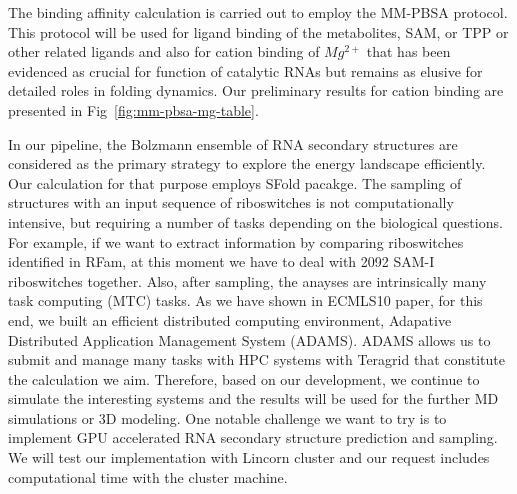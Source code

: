 \documentclass[a4paper,10pt]{article}
\begin{document}
The binding affinity calculation is carried out to employ the MM-PBSA protocol.  This protocol will be used for ligand binding of the metabolites, SAM, or TPP or other related ligands and also for cation binding of ${Mg^{2+}}$ that has been evidenced as crucial for function of catalytic RNAs but remains as elusive for detailed roles in folding dynamics.  Our preliminary results for cation binding are presented in Fig~\ref{fig:mm-pbsa-mg-table}.  


In our pipeline, the Bolzmann ensemble of RNA secondary structures are considered as the primary strategy to explore the energy landscape efficiently.  Our calculation for that purpose employs SFold pacakge\cite{ding2006}. The sampling of structures with an input sequence of riboswitches is not computationally intensive, but requiring a number of tasks depending on the biological questions.  For example, if we want to extract information by comparing riboswitches identified in RFam, at this moment we have to deal with 2092 SAM-I riboswitches together.  Also, after sampling, the anayses are intrinsically many task computing (MTC) tasks.   As we have shown in ECMLS10 paper\cite{ecmls10}, for this end, we built an efficient distributed computing environment, Adapative Distributed Application Management System (ADAMS).  ADAMS allows us to submit and manage many tasks with HPC systems with Teragrid that constitute the calculation we aim.  Therefore, based on our development, we continue to simulate the interesting systems and the results will be used for the further MD simulations or 3D modeling.
One notable challenge we want to try is to implement GPU accelerated RNA secondary structure prediction and sampling.  We will test our implementation with Lincorn cluster and our request includes computational time with the cluster machine. 




\end{document}
